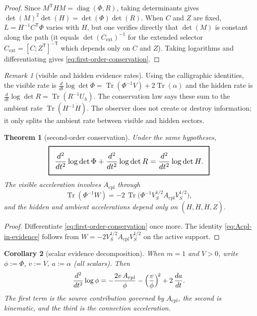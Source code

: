 \documentclass[11pt,a4paper]{article}
\numberwithin{equation}{section}
\DeclareMathOperator{\Tr}{Tr}
\DeclareMathOperator{\diag}{diag}
\newcommand{\geomboxed}[1]{%
  \setlength{\fboxsep}{8pt}%
  \setlength{\fboxrule}{0.9pt}%
  \fbox{\scalebox{1.10}{$\displaystyle #1$}}%
}
\theoremstyle{thmcompact}
\newtheorem{theorem}{Theorem}[section]
\newtheorem{corollary}[theorem]{Corollary}
\theoremstyle{remark}
\newtheorem*{remarkplain}{Remark}
\newenvironment{remark}[1][]%
{\begin{remarkbox}\begin{remarkplain}[#1]\normalfont}
{\end{remarkplain}\end{remarkbox}}
\begin{document}
\begin{proof}
Since $M^{\mathsf T}HM=\diag(\Phi,R)$, taking determinants gives $\det(M)^2\det(H)=\det(\Phi)\det(R)$. When $C$ and $Z$ are fixed, $L=H^{-1}C^{\mathsf T}\Phi$ varies with $H$, but one verifies directly that $\det(M)$ is constant along the path (it equals $\det(C_{\mathrm{ext}})^{-1}$ for the extended selector $C_{\mathrm{ext}}=[C;Z^{\mathsf T}]^{-\mathsf T}$ which depends only on $C$ and $Z$). Taking logarithms and differentiating gives \eqref{eq:first-order-conservation}.
\end{proof}

\begin{remark}[visible and hidden evidence rates]
Using the calligraphic identities, the visible rate is $\frac{d}{dt}\log\det\Phi=\Tr(\Phi^{-1}V)+2\Tr(\alpha)$ and the hidden rate is $\frac{d}{dt}\log\det R=\Tr(R^{-1}U_h)$. The conservation law says these sum to the ambient rate $\Tr(H^{-1}\dot H)$. The observer does not create or destroy information; it only splits the ambient rate between visible and hidden sectors.
\end{remark}

\begin{theorem}[second-order conservation]\label{thm:second-order-conservation}
Under the same hypotheses,
\begin{equation}
\geomboxed{\frac{d^2}{dt^2}\log\det\Phi+\frac{d^2}{dt^2}\log\det R=\frac{d^2}{dt^2}\log\det H.}
\label{eq:second-order-conservation}
\end{equation}
The visible acceleration involves $A_{\mathrm{cpl}}$ through
\begin{equation}
\Tr(\Phi^{-1}W)=-2\,\Tr\!\bigl(\Phi^{-1}V_S^{1/2}A_{\mathrm{cpl}}V_S^{1/2}\bigr),
\label{eq:Acpl-in-evidence}
\end{equation}
and the hidden and ambient accelerations depend only on $(H,\dot H,\ddot H,Z)$.
\end{theorem}

\begin{proof}
Differentiate \eqref{eq:first-order-conservation} once more. The identity \eqref{eq:Acpl-in-evidence} follows from $W=-2V_S^{1/2}A_{\mathrm{cpl}}V_S^{1/2}$ on the active support.
\end{proof}

\begin{corollary}[scalar evidence decomposition]\label{cor:scalar-evidence}
When $m=1$ and $V>0$, write $\phi:=\Phi$, $v:=V$, $a:=\alpha$ (all scalars). Then
\begin{equation}
\frac{d^2}{dt^2}\log\phi
=
-\frac{2v\,A_{\mathrm{cpl}}}{\phi}
-\Bigl(\frac{v}{\phi}\Bigr)^{\!2}
+2\,\frac{da}{dt}.
\label{eq:scalar-evidence}
\end{equation}
The first term is the source contribution governed by $A_{\mathrm{cpl}}$, the second is kinematic, and the third is the connection acceleration.
\end{corollary}
\end{document}
